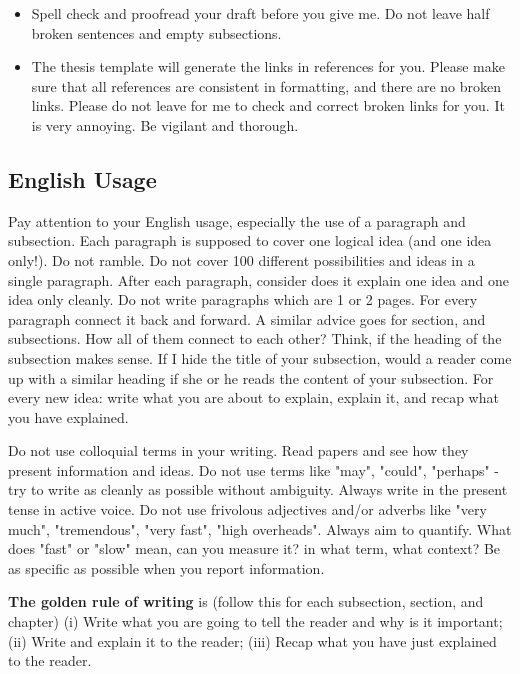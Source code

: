 \begin{itemize}
    \item Spell check and proofread your draft before you give me. Do not leave half broken sentences and empty 
    subsections.
    
    \item The thesis template will generate the links in references for you. Please make sure that all references 
    are consistent in formatting, and there are no broken links. Please do not leave for me to check and correct 
    broken links for you. It is very annoying. Be vigilant and thorough.
     
\end{itemize}

\subsection*{English Usage}
Pay attention to your English usage, especially the use of a paragraph and subsection. Each paragraph is supposed 
to cover one logical idea (and one idea only!). Do not ramble. Do not cover 100 different possibilities and ideas 
in a single paragraph. After each paragraph, consider does it explain one idea and one idea only cleanly. Do not 
write paragraphs which are 1 or 2 pages. For every paragraph connect it back and forward. A similar advice goes for 
section, and subsections. How all of them connect to each other? Think, if the heading of the subsection makes sense. 
If I hide the title of your subsection, would a reader come up with a similar heading if she or he reads the content 
of your subsection. For every new idea: write what you are about to explain, explain it, and recap what you have 
explained. 


Do not use colloquial terms in your writing. Read papers and see how they present information and ideas. Do not 
use terms like "may", "could", "perhaps" - try to write as cleanly as possible without ambiguity. 
Always write in the present tense in active voice. Do not use frivolous adjectives and/or adverbs like 
"very much", "tremendous", "very fast", "high overheads". Always aim to quantify. What does "fast" or  "slow" mean, 
can you measure it? in what term, what context? Be as specific as possible when you report information. 


\textbf{The golden rule of writing} is (follow this for each subsection, section, and chapter) 
(i) Write what you are going to tell the reader and why is it important; 
(ii) Write and explain it to the reader; 
(iii) Recap what you have just explained to the reader.  


